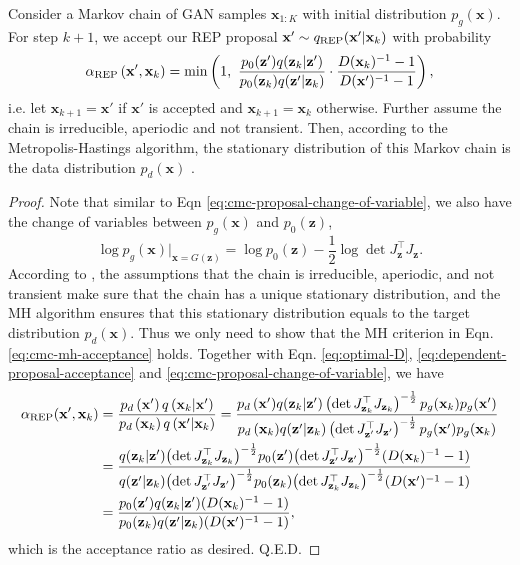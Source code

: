 \documentclass[runningheads]{llncs}
\newcommand{\bx}{\mathbf{x}}
\newcommand{\bz}{\mathbf{z}}
\newcommand{\<}{\left\langle}
\renewcommand{\>}{\right\rangle}
\begin{document}
\begin{theorem}
\label{thm:emh}
Consider a Markov chain of GAN samples $\bx_{1:K}$ with initial distribution $p_g(\bx)$. For step $k+1$, we accept our REP proposal $\bx'\sim q_{\rm REP}(\bx'|\bx_k)$ with probability
\begin{equation}
\alpha_{\rm REP}\left(\mathbf{x}^{\prime}, \mathbf{x}_{k}\right)
=\min \left(1,~\frac{p_0(\bz')q(\bz_k|\bz')}{p_0(\bz_k)q(\bz'|\bz_k)}\cdot
\frac{D(\bx_k)^{-1}-1}{D(\bx')^{-1}-1}\right),
\label{eq:cmc-mh-acceptance}
\end{equation}
i.e. let $\bx_{k+1}=\bx'$ if $\bx'$ is accepted and $\bx_{k+1}=\bx_k$ otherwise. Further assume the chain is irreducible, aperiodic and not transient. Then, according to the Metropolis-Hastings algorithm, the stationary distribution of this Markov chain is the data distribution $p_d(\bx)$ \cite{gelman2013bayesian}.
\label{thm:main}
\end{theorem}

\begin{proof}
Note that similar to Eqn \eqref{eq:cmc-proposal-change-of-variable},  we also have the change of variables between $p_g(\bx)$ and $p_0(\bz)$,
\begin{equation}
\log p_g(\bx)\rvert_{\bx=G(\bz)}=\log p_0(\bz) - \frac{1}{2} \log \det J_{\bz}^\top J_{\bz}.
\label{eq:generator-change-of-variable}
\end{equation}
According to \cite{gelman2013bayesian}, the assumptions that the chain is irreducible, aperiodic, and not transient make sure that the chain has a unique stationary distribution, and the MH algorithm ensures that this stationary distribution equals to the target distribution $p_d(\bx)$.
Thus we only need to show that the MH criterion in Eqn. \eqref{eq:cmc-mh-acceptance} holds. Together with Eqn. \eqref{eq:optimal-D}, \eqref{eq:dependent-proposal-acceptance} and \eqref{eq:cmc-proposal-change-of-variable}, we have
\begin{equation}
\begin{aligned}
\alpha_{\rm REP}(\bx',\bx_k)
&=\frac{p_d\left(\mathbf{x}^{\prime}\right)  q\left(\mathbf{x}_{k}|\bx'\right)}{p_d\left(\mathbf{x}_{k}\right)  q\left(\mathbf{x}^{\prime}|\bx_k\right)}
=\frac{{p_d\left(\mathbf{x}^{\prime}\right)}  q(\bz_k|\bz')
\left(\det J_{\bz_k}^\top J_{\bz_k}\right)^{-\frac{1}{2}}
{p_g(\bx_k)}p_g(\bx')}{{p_d\left(\mathbf{x}_{k}\right)}  q(\bz'|\bz_k)
\left(\det J_{\bz'}^\top J_{\bz'}\right)^{-\frac{1}{2}}
{p_g(\bx')}p_g(\bx_k)}\\
&=\frac{q(\bz_k|\bz'){\left(\det J_{\bz_k}^\top J_{\bz_k}\right)^{-\frac{1}{2}}}p_0(\bz'){\left(\det J_{\bz'}^\top J_{\bz'}\right)^{-\frac{1}{2}}}(D(\bx_k)^{-1}-1)}
{q(\bz'|\bz_k){\left(\det J_{\bz'}^\top J_{\bz'}\right)^{-\frac{1}{2}}}p_0(\bz_k){\left(\det J_{\bz_k}^\top J_{\bz_k}\right)^{-\frac{1}{2}}}(D(\bx')^{-1}-1)}\\
&=\frac{p_0(\bz')q(\bz_k|\bz')(D(\bx_k)^{-1}-1)}{p_0(\bz_k)q(\bz'|\bz_k)(D(\bx')^{-1}-1)},
\end{aligned}
\label{eq:dcgan-cmc-alpha}
\end{equation}
which is the acceptance ratio as desired. Q.E.D.
\end{proof}
\end{document}
